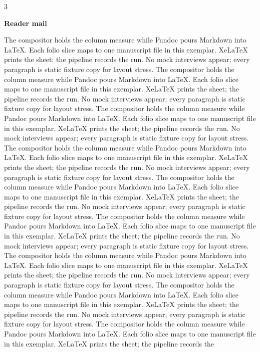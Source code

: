 \documentclass[
]{article}
\begin{document}
\begin{multicols}{3}

\textbf{Reader mail}

The compositor holds the column measure while Pandoc pours Markdown into
LaTeX. Each folio slice maps to one manuscript file in this exemplar.
XeLaTeX prints the sheet; the pipeline records the run. No mock
interviews appear; every paragraph is static fixture copy for layout
stress. The compositor holds the column measure while Pandoc pours
Markdown into LaTeX. Each folio slice maps to one manuscript file in
this exemplar. XeLaTeX prints the sheet; the pipeline records the run.
No mock interviews appear; every paragraph is static fixture copy for
layout stress. The compositor holds the column measure while Pandoc
pours Markdown into LaTeX. Each folio slice maps to one manuscript file
in this exemplar. XeLaTeX prints the sheet; the pipeline records the
run. No mock interviews appear; every paragraph is static fixture copy
for layout stress. The compositor holds the column measure while Pandoc
pours Markdown into LaTeX. Each folio slice maps to one manuscript file
in this exemplar. XeLaTeX prints the sheet; the pipeline records the
run. No mock interviews appear; every paragraph is static fixture copy
for layout stress. The compositor holds the column measure while Pandoc
pours Markdown into LaTeX. Each folio slice maps to one manuscript file
in this exemplar. XeLaTeX prints the sheet; the pipeline records the
run. No mock interviews appear; every paragraph is static fixture copy
for layout stress. The compositor holds the column measure while Pandoc
pours Markdown into LaTeX. Each folio slice maps to one manuscript file
in this exemplar. XeLaTeX prints the sheet; the pipeline records the
run. No mock interviews appear; every paragraph is static fixture copy
for layout stress. The compositor holds the column measure while Pandoc
pours Markdown into LaTeX. Each folio slice maps to one manuscript file
in this exemplar. XeLaTeX prints the sheet; the pipeline records the
run. No mock interviews appear; every paragraph is static fixture copy
for layout stress. The compositor holds the column measure while Pandoc
pours Markdown into LaTeX. Each folio slice maps to one manuscript file
in this exemplar. XeLaTeX prints the sheet; the pipeline records the
run. No mock interviews appear; every paragraph is static fixture copy
for layout stress. The compositor holds the column measure while Pandoc
pours Markdown into LaTeX. Each folio slice maps to one manuscript file
in this exemplar. XeLaTeX prints the sheet; the pipeline records the

\end{multicols}
\end{document}
